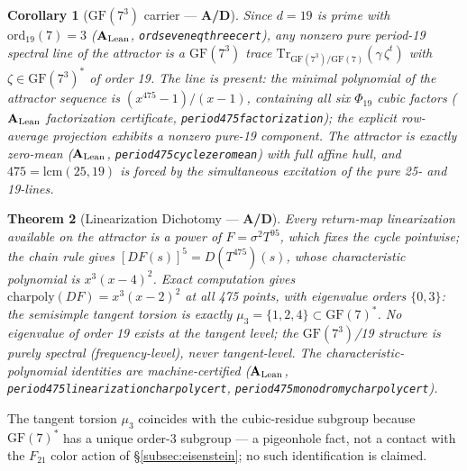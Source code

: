 \documentclass[11pt]{article}
\newtheorem{theorem}{Theorem}[section]
\newtheorem{corollary}[theorem]{Corollary}
\theoremstyle{remark}
\newcommand{\GF}[1]{\ensuremath{\mathrm{GF}(#1)}}
\newcommand{\lean}[1]{%
  \penalty-100
  \begingroup\def\_{\textunderscore\allowbreak}\texttt{#1}\endgroup}
\newcommand{\CatAL}{\texorpdfstring{\ensuremath{\textbf{A}_{\rm Lean}}}{A-Lean}}
\newcommand{\CatAD}{\textbf{A/D}}
\begin{document}
\begin{corollary}[$\GF{7^3}$ carrier --- \CatAD{}]
\label{cor:gf73carrier}
Since $d = 19$ is prime with $\mathrm{ord}_{19}(7) = 3$ (\CatAL{},
\lean{ord\_19\_seven\_eq\_three\_cert}), any nonzero pure period-19
spectral line of the attractor is a $\GF{7^3}$ trace
$\mathrm{Tr}_{\GF{7^3}/\GF{7}}(\gamma\,\zeta^t)$ with
$\zeta \in \GF{7^3}^{*}$ of order 19. The line is present: the minimal polynomial
of the attractor sequence is $(x^{475}-1)/(x-1)$, containing all six
$\Phi_{19}$ cubic factors (\CatAL{} factorization certificate,
\lean{period475\_factorization}); the explicit row-average projection
exhibits a nonzero pure-19 component. The attractor is exactly zero-mean
(\CatAL{}, \lean{period475\_cycle\_zero\_mean}) with full affine hull, and
$475 = \mathrm{lcm}(25, 19)$ is forced by the simultaneous excitation of
the pure 25- and 19-lines.
\end{corollary}

\begin{theorem}[Linearization Dichotomy --- \CatAD{}]
\label{thm:linearizationnogo}
Every return-map linearization available on the attractor is a power of
$F = \sigma^2 T^{95}$, which fixes the cycle pointwise; the chain rule
gives $[DF(s)]^5 = D(T^{475})(s)$, whose characteristic polynomial is
$x^3(x-4)^2$. Exact computation gives $\mathrm{charpoly}(DF) = x^3(x-2)^2$
at all 475 points, with eigenvalue orders $\{0, 3\}$: the semisimple
tangent torsion is exactly $\mu_3 = \{1,2,4\} \subset \GF{7}^*$. No
eigenvalue of order 19 exists at the tangent level; the $\GF{7^3}$/19
structure is purely spectral (frequency-level), never tangent-level.
The characteristic-polynomial identities are machine-certified (\CatAL{},
\lean{period475\_linearization\_charpoly\_cert},
\lean{period475\_monodromy\_charpoly\_cert}).
\end{theorem}

The tangent torsion $\mu_3$ coincides with the cubic-residue subgroup
because $\GF{7}^*$ has a unique order-3 subgroup --- a pigeonhole fact, not
a contact with the $F_{21}$ color action of §\ref{subsec:eisenstein}; no
such identification is claimed.
\end{document}
